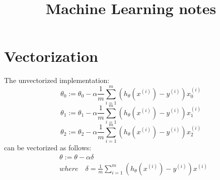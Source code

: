 \documentclass{article}
\begin{document}
\title{Machine Learning notes}
\maketitle
\setcounter{page}{1}

\section{Vectorization}
The unvectorized implementation:
$$\theta_0 := \theta_0 - \alpha \frac{1}{m} \sum_{i=1}^{m}(h_\theta(x^{(i)}) - y^{(i)})x_{0}^{(i)}$$
$$\theta_1 := \theta_1 - \alpha \frac{1}{m} \sum_{i=1}^{m}(h_\theta(x^{(i)}) - y^{(i)})x_{1}^{(i)}$$
$$\theta_2 := \theta_2 - \alpha \frac{1}{m} \sum_{i=1}^{m}(h_\theta(x^{(i)}) - y^{(i)})x_{2}^{(i)}$$
can be vectorized as follows:
\begin{equation*}
\begin{aligned}
&\theta := \theta - \alpha\delta  \\
&where \quad \delta = \frac{1}{m}\sum_{i=1}^{m}(h_\theta(x^{(i)}) - y^{(i)})x^{(i)} 
\end{aligned}
\end{equation*}
\end{document}
